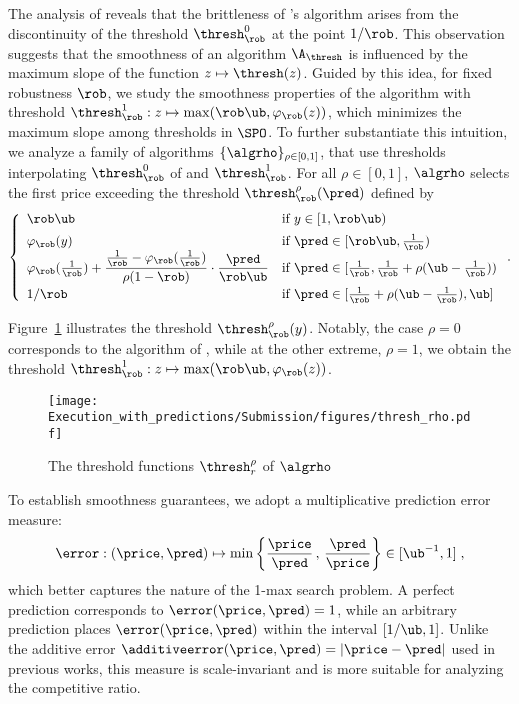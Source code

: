 The analysis of \citet{benomar2025tradeoffs} reveals that the brittleness of \citet{sun_pareto-optimal_2021}'s algorithm arises from the discontinuity of the threshold $\thresh^0_\rob$ at the point $1/\rob$. This observation suggests that the smoothness of an algorithm $\A_\thresh$ is influenced by the maximum slope of the function $z \mapsto \thresh(z)$. Guided by this idea, for fixed robustness $\rob$, we study the smoothness properties of the algorithm with threshold $\thresh^1_\rob: z \mapsto \max(\rob \ub, \varphi_\rob(z))$, which minimizes the maximum slope among thresholds in $\SPO$. To further substantiate this intuition, we analyze a family of algorithms $\{\algrho\}_{\rho \in [0,1]}$, that use thresholds interpolating $\thresh^0_\rob$ of \cite{sun_pareto-optimal_2021} and $\thresh^1_\rob$. For all $\rho \in [0,1]$, $\algrho$ selects the first price exceeding the threshold $\thresh^\rho_\rob(\pred)$ defined by
\[
\left\{
 \begin{array}{lll}
    \rob \ub & \text{if } y \in [1,\rob \ub) \\[5pt]
     \varphi_\rob(y) & \text{if } \pred \in [\rob \ub, \tfrac{1}{\rob})\\
     \varphi_\rob(\tfrac{1}{\rob}) + \dfrac{\tfrac{1}{\rob} - \varphi_\rob(\tfrac{1}{\rob})}{\rho (1-\rob)} \cdot \dfrac{\pred}{\rob \ub} & \text{if } \pred \in [\tfrac{1}{\rob}, \tfrac{1}{\rob} + \rho(\ub - \tfrac{1}{\rob}))\\[8pt]
     1/\rob & \text{if } \pred \in [\tfrac{1}{\rob} + \rho(\ub - \tfrac{1}{\rob}), \ub]
\end{array}
\right. .
\]

Figure~\ref{fig:thresh_rho} illustrates the threshold $\thresh^\rho_\rob(y)$. Notably, the case $\rho = 0$ corresponds to the algorithm of \citet{sun_pareto-optimal_2021}, while at the other extreme, $\rho = 1$, we obtain the threshold $\thresh^1_\rob: z \mapsto \max(\rob \ub, \varphi_\rob(z))$.

\begin{figure}[t]
    \centering
    \texttt{[image: Execution\_with\_predictions/Submission/figures/thresh\_rho.pdf]}
    \caption{The threshold functions $\thresh^\rho_r$ of $\algrho$}
    \label{fig:thresh_rho}
\end{figure}

To establish smoothness guarantees, we adopt a multiplicative prediction error measure:  
\begin{align}
    \error:(\price,\pred)\mapsto \min\left\{\frac{\price}{\pred}\,,\,\frac{\pred}{\price}\right\}\in [\ub^{-1},1]\;,
\end{align}
which better captures the nature of the 1-max search problem. A perfect prediction corresponds to $\error(\price, \pred) = 1$, while an arbitrary prediction places $\error(\price, \pred)$ within the interval $[1/\ub, 1]$.
Unlike the additive error $\additiveerror(\price, \pred) = |\price - \pred|$ used in previous works, this measure is scale-invariant and is more suitable for analyzing the competitive ratio.

